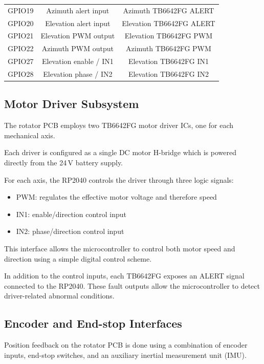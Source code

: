\begin{table}[H]
\begin{tabular}{|c|c|c|}
\hline
GPIO19 & Azimuth alert input & Azimuth TB6642FG ALERT \\
GPIO20 & Elevation alert input & Elevation TB6642FG ALERT \\
GPIO21 & Elevation PWM output & Elevation TB6642FG PWM \\
GPIO22 & Azimuth PWM output & Azimuth TB6642FG PWM \\
\hline
GPIO27 & Elevation enable / IN1 & Elevation TB6642FG IN1 \\
GPIO28 & Elevation phase / IN2  & Elevation TB6642FG IN2 \\
\hline
\end{tabular}
\label{tab:rp2040_rotator_pinout}
\end{table}

\subsection{Motor Driver Subsystem}
\label{subsec:rotator_motor_driver}

The rotator PCB employs two TB6642FG motor driver ICs, one for each mechanical axis.

Each driver is configured as a single DC motor H-bridge which is powered directly from the 24\,V battery supply.

For each axis, the RP2040 controls the driver through three logic signals:

\begin{itemize}
\item PWM: regulates the effective motor voltage and therefore speed
\item IN1: enable/direction control input
\item IN2: phase/direction control input
\end{itemize}

This interface allows the microcontroller to control both motor speed and direction using a simple digital control scheme.

In addition to the control inputs, each TB6642FG exposes an ALERT signal connected to the RP2040. These fault outputs allow the microcontroller to detect driver-related abnormal conditions.

\subsection{Encoder and End-stop Interfaces}
\label{subsec:rotator_feedback}

Position feedback on the rotator PCB is done using a combination of encoder inputs, end-stop switches, and an auxiliary inertial measurement unit (IMU).

